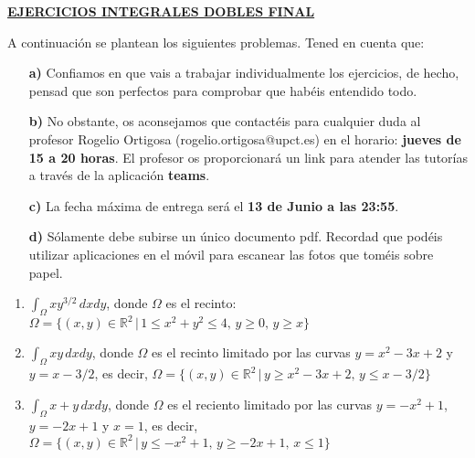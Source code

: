 \documentclass[preprint,12pt]{elsarticle}
\begin{document}
\vspace{15cm}

\begin{center}
\underline{\textbf{EJERCICIOS INTEGRALES DOBLES FINAL}}
\end{center}


A continuaci\'on se plantean los siguientes problemas. Tened en cuenta que:

\begin{itemize}
	\item [\textbf{a)}] Confiamos en que vais a trabajar individualmente los ejercicios, de hecho, pensad que son perfectos para comprobar que hab\'eis entendido todo.
	\item [\textbf{b)}]  No obstante, os aconsejamos que contact\'eis para cualquier duda al profesor Rogelio Ortigosa ({\textcolor[rgb]{0,0,1}{rogelio.ortigosa@upct.es}}) en el horario: \textbf{jueves de 15 a 20 horas}. El profesor os proporcionar\'a un link para atender las tutor\'ias a trav\'es de la aplicaci\'on \textbf{teams}.
	
	\item [\textbf{c)}] La {fecha m\'axima de entrega} ser\'a el \textbf{13 de Junio a las 23:55}.
	
	\item [\textbf{d)}] S\'olamente debe subirse un \'unico documento pdf. Recordad que pod\'eis utilizar aplicaciones en el m\'ovil para escanear las fotos que tom\'eis sobre papel.


\end{itemize}


\vspace{2mm}

\begin{enumerate}
	\item $\int_{\Omega}x y^{3/2}\,dxdy$, donde $\Omega$ es el recinto: $\Omega=\{(x,y)\in\mathbb{R}^2\,\vert\, 1\leq x^2+y^2\leq 4,\,y\geq 0,\,y\geq x\}$
	
	\vspace{4mm}
	
	\item $\int_{\Omega}x y\,dxdy$, donde $\Omega$ es el recinto limitado por las curvas $y=x^2-3x+2$ y $y=x-3/2$, es decir, $\Omega=\{(x,y)\in\mathbb{R}^2\,\vert\, y\geq x^2-3x+2,\,y\leq x-3/2\}$
	
	
	\vspace{4mm}
	
	\item $\int_{\Omega}x+y\,dxdy$, donde $\Omega$ es el reciento limitado por las curvas $y=-x^2+1$, $y=-2x+1$ y $x=1$, es decir, $\Omega=\{(x,y)\in\mathbb{R}^2\,\vert\, y\leq -x^2+1,\,y\geq -2x+1,\,x\leq 1\}$
	

\end{enumerate}






%


\end{document}
